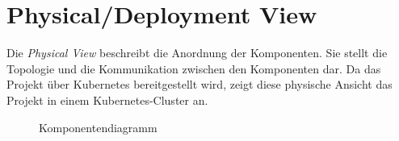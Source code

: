 \section{Physical/Deployment View}

Die \textit{Physical View} beschreibt die Anordnung der Komponenten. Sie stellt die Topologie und die Kommunikation zwischen den Komponenten dar. 
Da das Projekt über Kubernetes bereitgestellt wird, zeigt diese physische Ansicht das Projekt in einem Kubernetes-Cluster an.  
\begin{figure}[!ht]
    \centering
    \caption{Komponentendiagramm}
    \label{fig:component}
\end{figure}
